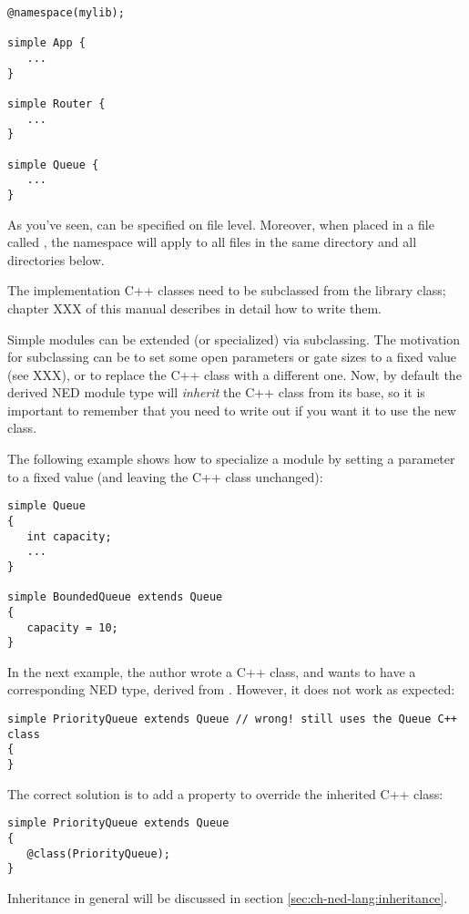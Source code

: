 \begin{Verbatim}
@namespace(mylib);

simple App {
   ...
}

simple Router {
   ...
}

simple Queue {
   ...
}
\end{Verbatim}

As you've seen,  can be specified on file level. Moreover,
when placed in a file called , the namespace will apply to
all files in the same directory and all directories below.

The implementation C++ classes need to be subclassed from the
 library class; chapter XXX of this manual describes
in detail how to write them.

Simple modules can be extended (or specialized) via subclassing.
The motivation for subclassing can be to set some open parameters
or gate sizes to a fixed value (see XXX), or to replace the C++
class with a different one. Now, by default the derived NED module type
will \textit{inherit} the C++ class from its base, so it is important
to remember that you need to write out  if you want it
to use the new class.

The following example shows how to specialize a module by setting a parameter
to a fixed value (and leaving the C++ class unchanged):

\begin{Verbatim}
simple Queue
{
   int capacity;
   ...
}

simple BoundedQueue extends Queue
{
   capacity = 10;
}
\end{Verbatim}

In the next example, the author wrote a  C++ class, and
wants to have a corresponding NED type, derived from . However,
it does not work as expected:

\begin{Verbatim}
simple PriorityQueue extends Queue // wrong! still uses the Queue C++ class
{
}
\end{Verbatim}

The correct solution is to add a  property to override the
inherited C++ class:

\begin{Verbatim}
simple PriorityQueue extends Queue
{
   @class(PriorityQueue);
}
\end{Verbatim}

Inheritance in general will be discussed in section \ref{sec:ch-ned-lang:inheritance}.


